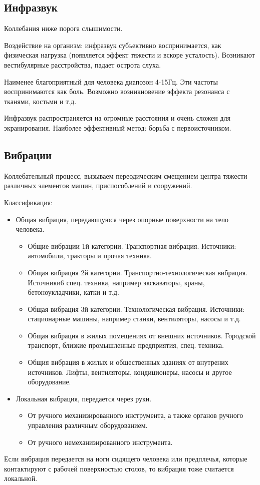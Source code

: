 \subsection{Инфразвук}
Коллебания ниже порога слышимости. 

Воздействие на организм: инфразвук субъективно воспринимается, как физическая нагрузка (появляется эффект тяжести и вскоре усталость). Возникают вестибулярные расстройства, падает острота слуха.

Наименее благоприятный для человека диапозон 4-15Гц. Эти частоты воспринимаются как боль. Возможно возникновение эффекта резонанса с тканями, костьми и т.д. 

Инфразвук распространяется на огромные расстояния и очень сложен для экранирования. Наиболее эффективный метод: борьба с первоисточником.

\subsection{Вибрации}
Коллебательный процесс, вызываем переодическим смещением центра тяжести различных элементов машин, приспособлений и сооружений.

Классификация:
\begin{itemize}
	\item Общая вибрация, передающуюся через опорные поверхности на тело человека.
	\begin{itemize}
		\item Общие вибрации 1й категории. Транспортная вибрация. Источники: автомобили, тракторы и прочая техника.
		\item Общая вибрация 2й категории. Транспортно-технологическая вибрация. Источники6 спец. техника, например экскаваторы, краны, бетоноукладчики, катки и т.д.
		\item Общая вибрация 3й категории. Технологическая вибрация. Источники: стационарные машины, например станки, вентиляторы, насосы и т.д.
		\item Общая вибрация в жилых помещениях от внешних источников. Городской транспорт, близкие промышленные предприятия, спец. техника.
		\item Общия вибрация в жилых и общественных зданиях от внутрених источников. Лифты, вентиляторы, кондиционеры, насосы и другое оборудование.
	\end{itemize}
	\item Локальная вибрация, передается через руки. 
	\begin{itemize}
		\item От ручного механизированного инструмента, а также органов ручного управления различным оборудованием.
		\item От ручного немеханизированного инструмента.
	\end{itemize}
\end{itemize}
Если вибрация передается на ноги сидящего человека или предплечья, которые контактируют с рабочей поверхностью столов, то вибрация тоже считается локальной.

